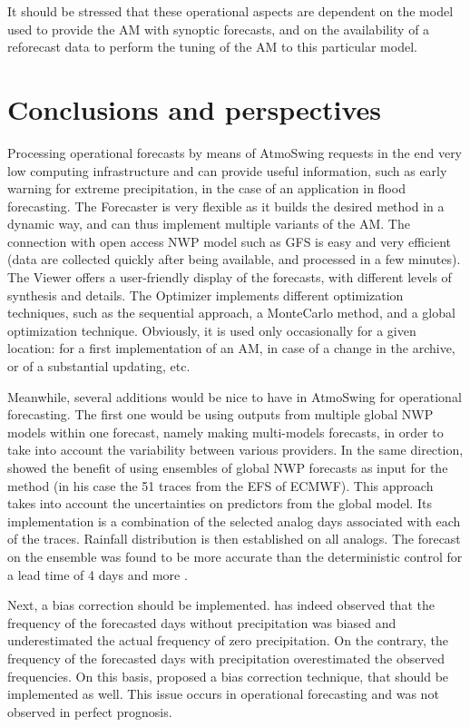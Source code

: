 \documentclass[review]{elsarticle}
\begin{document}
It should be stressed that these operational aspects are dependent on the model used to provide the AM with synoptic forecasts, and on the availability of a reforecast data to perform the tuning of the AM to this particular model.


\section{Conclusions and perspectives}
\label{sec:conclusions}

Processing operational forecasts by means of AtmoSwing requests in the end very low computing infrastructure and can provide useful information, such as early warning for extreme precipitation, in the case of an application in flood forecasting. The Forecaster is very flexible as it builds the desired method in a dynamic way, and can thus implement multiple variants of the AM. The connection with open access NWP model such as GFS is easy and very efficient (data are collected quickly after being available, and processed in a few minutes). The Viewer offers a user-friendly display of the forecasts, with different levels of synthesis and details. The Optimizer implements different optimization techniques, such as the sequential approach, a Monte\textendash Carlo method, and a global optimization technique. Obviously, it is used only occasionally for a given location: for a first implementation of an AM, in case of a change in the archive, or of a substantial updating, etc.

Meanwhile, several additions would be nice to have in AtmoSwing for operational forecasting. The first one would be using outputs from multiple global NWP models within one forecast, namely making multi-models forecasts, in order to take into account the variability between various providers. In the same direction, \citet{Thevenot2004} showed the benefit of using ensembles of global NWP forecasts as input for the method (in his case the 51 traces from the EFS of ECMWF). This approach takes into account the uncertainties on predictors from the global model. Its implementation is a combination of the selected analog days associated with each of the traces. Rainfall distribution is then established on all analogs. The forecast on the ensemble was found to be more accurate than the deterministic control for a lead time of 4 days and more \citep{Thevenot2004}. 

Next, a bias correction should be implemented. \citet{Marty2010} has indeed observed that the frequency of the forecasted days without precipitation was biased and underestimated the actual frequency of zero precipitation. On the contrary, the frequency of the forecasted days with precipitation overestimated the observed frequencies. On this basis, \citet{Marty2010} proposed a bias correction technique, that should be implemented as well. This issue occurs in operational forecasting and was not observed in perfect prognosis.
\end{document}
